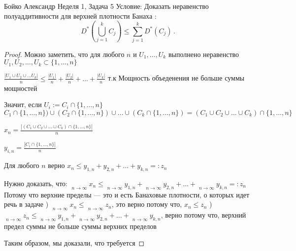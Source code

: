 \documentclass[a4paper,12pt]{article}
\numberwithin{equation}{section}
\theoremstyle{plain}
\theoremstyle{definition}
\theoremstyle{remark}
\DeclareMathOperator*\uplim{\overline{lim}}
\begin{document}

Бойко Александр
\newline
\newline
Неделя 1, Задача 5 \newline
Условие:
Доказать неравенство полуаддитивности для верхней плотности Банаха :
$$
D^* \left( \bigcup_{j=1}^k C_j \right) \le \sum_{j=1}^k D^* (C_j) \,.
$$

\begin{proof}
Можно заметить, что для любого $n$ и $U_1, \ldots, U_k$ выполнено неравенство \newline
$U_1, U_2, \ldots, U_k \subset \{1, \ldots,n\}$ \newline

$\frac{|U_1 \cup U_2 \cup \ldots U_k|}{n} \leq \frac{|U_1|}{n} + \frac{|U_2|}{n} + \ldots + \frac{|U_k|}{n}$ т.к Мощность объеденения не больше суммы мощностей \newline

Значит, если 
$U_i := C_i \cap \{1, \ldots, n\}$ \newline
$C_1 \cap \{1, \ldots, n\}) \cup (C_2 \cap \{1, \ldots, n\}) \cup \ldots \cup (C_k \cap \{1,\ldots, n\}) = (C_1 \cup C_2 \cup \ldots \cup C_k) \cap \{1, \ldots, n\}$

$x_n = \frac{|(C_1 \cup C_2 \cup \ldots \cup C_k) \cap \{1, \ldots, n\}|}{n}$ \newline

$y_{i,n} = \frac{|C_i \cap \{1,\ldots,n\}|}{n}$ \newline

Для любого $n$ верно $x_n \leq y_{1,n} + y_{2,n} + \ldots + y_{k,n} =: z_n$

Нужно доказать, что:
$\uplim\limits_{n \to \infty}{x_n} \leq \uplim\limits_{n \to \infty}{y_{1,n}} + \uplim\limits_{n \to \infty}{y_{2,n}} + \ldots + \uplim\limits_{n \to \infty}{y_{k,n}} =: z_n $ \newline
Потому что верхние пределы --- это и есть Банаховые плотности, о которых идет речь в задаче ) $\uplim\limits_{n \to \infty}{x_n} \leq \uplim\limits_{n \to \infty}{z_n}$, это верно потому что, $x_n \leq z_n$ ) $\uplim\limits_{n \to \infty}{z_n} \leq \uplim\limits_{n \to \infty}{y_{1,n}} + \uplim\limits_{n \to \infty}{y_{2,n}} + \ldots + \uplim\limits_{n \to \infty}{y_{k,n}}$, верно потому что, верхний предел суммы не больше суммы верхних пределов \newline

Таким образом, мы доказали, что требуется
\end{proof}
\end{document}
